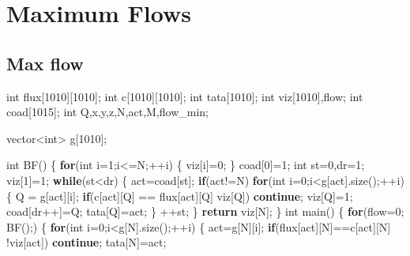 \documentclass[10pt,]{article}
\newenvironment{Shaded}{}{}
\newcommand{\KeywordTok}[1]{\textcolor[rgb]{0.00,0.44,0.13}{\textbf{{#1}}}}
\newcommand{\DataTypeTok}[1]{\textcolor[rgb]{0.56,0.13,0.00}{{#1}}}
\newcommand{\DecValTok}[1]{\textcolor[rgb]{0.25,0.63,0.44}{{#1}}}
\newcommand{\NormalTok}[1]{{#1}}
\begin{document}
\section{Maximum Flows}

\subsection{Max flow}

\begin{Shaded}
\begin{Highlighting}[]
\DataTypeTok{int} \NormalTok{flux[}\DecValTok{1010}\NormalTok{][}\DecValTok{1010}\NormalTok{];}
\DataTypeTok{int} \NormalTok{c[}\DecValTok{1010}\NormalTok{][}\DecValTok{1010}\NormalTok{];}
\DataTypeTok{int} \NormalTok{tata[}\DecValTok{1010}\NormalTok{];}
\DataTypeTok{int} \NormalTok{viz[}\DecValTok{1010}\NormalTok{],flow;}
\DataTypeTok{int} \NormalTok{coad[}\DecValTok{1015}\NormalTok{];}
\DataTypeTok{int} \NormalTok{Q,x,y,z,N,act,M,flow_min;}

\NormalTok{vector<}\DataTypeTok{int}\NormalTok{> g[}\DecValTok{1010}\NormalTok{];}

\DataTypeTok{int} \NormalTok{BF() \{}
  \KeywordTok{for}\NormalTok{(}\DataTypeTok{int} \NormalTok{i=}\DecValTok{1}\NormalTok{;i<=N;++i) \{}
    \NormalTok{viz[i]=}\DecValTok{0}\NormalTok{;}
  \NormalTok{\}}
  \NormalTok{coad[}\DecValTok{0}\NormalTok{]=}\DecValTok{1}\NormalTok{;}
  \DataTypeTok{int} \NormalTok{st=}\DecValTok{0}\NormalTok{,dr=}\DecValTok{1}\NormalTok{;}
  \NormalTok{viz[}\DecValTok{1}\NormalTok{]=}\DecValTok{1}\NormalTok{;}
  \KeywordTok{while}\NormalTok{(st<dr) \{}
    \NormalTok{act=coad[st];}
    \KeywordTok{if}\NormalTok{(act!=N)}
      \KeywordTok{for}\NormalTok{(}\DataTypeTok{int} \NormalTok{i=}\DecValTok{0}\NormalTok{;i<g[act].size();++i) \{}
        \NormalTok{Q = g[act][i];}
        \KeywordTok{if}\NormalTok{(c[act][Q] == flux[act][Q] \textbar{}\textbar{} viz[Q])}
          \KeywordTok{continue}\NormalTok{;}
        \NormalTok{viz[Q]=}\DecValTok{1}\NormalTok{;}
        \NormalTok{coad[dr++]=Q;}
        \NormalTok{tata[Q]=act;}
      \NormalTok{\}}
    \NormalTok{++st;}
  \NormalTok{\}}
  \KeywordTok{return} \NormalTok{viz[N];}
\NormalTok{\}}
\DataTypeTok{int} \NormalTok{main() \{}
  \KeywordTok{for}\NormalTok{(flow=}\DecValTok{0}\NormalTok{; BF();) \{}
    \KeywordTok{for}\NormalTok{(}\DataTypeTok{int} \NormalTok{i=}\DecValTok{0}\NormalTok{;i<g[N].size();++i) \{}
      \NormalTok{act=g[N][i];}
      \KeywordTok{if}\NormalTok{(flux[act][N]==c[act][N] \textbar{}\textbar{}!viz[act])}
        \KeywordTok{continue}\NormalTok{;}
      \NormalTok{tata[N]=act;}


\end{Highlighting}
\end{Shaded}
\end{document}
